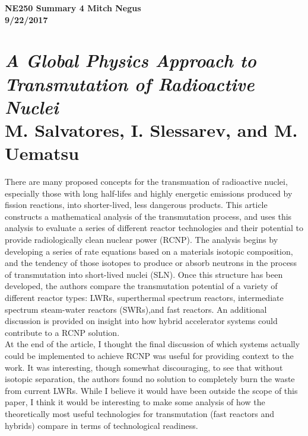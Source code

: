 \documentclass{report}
\newcommand{\tab}{\-\hspace{1cm}}
\begin{document}
\thispagestyle{empty}

{\bf {\large {NE250 Summary {4} \hfill Mitch Negus\\
		\hspace*{\fill} 9/22/2017\\ }}}
\section*{\textsl{A Global Physics Approach to Transmutation of Radioactive Nuclei} \\ \normalsize M. Salvatores, I. Slessarev, and M. Uematsu}

\tab There are many proposed concepts for the transmuation of radioactive nuclei, especially those with long half-lifes and highly energetic emissions produced by fission reactions, into shorter-lived, less dangerous products. This article constructs a mathematical analysis of the transmutation process, and uses this analysis to evaluate a series of different reactor technologies and their potential to provide radiologically clean nuclear power (RCNP). The analysis begins by developing a series of rate equations based on a materials isotopic composition, and the tendency of those isotopes to produce or absorb neutrons in the process of transmutation into short-lived nuclei (SLN). Once this structure has been developed, the authors compare the transmutation potential of a variety of different reactor types: LWRs, superthermal spectrum reactors, intermediate spectrum steam-water reactors (SWRs),and fast reactors. An additional discussion is provided on insight into how hybrid accelerator systems could contribute to a RCNP solution.\\
\tab At the end of the article, I thought the final discussion of which systems actually could be implemented to achieve RCNP was useful for providing context to the work. It was interesting, though somewhat discouraging, to see that without isotopic separation, the authors found no solution to completely burn the waste from current LWRs. While I believe it would have been outside the scope of this paper, I think it would be interesting to make some analysis of how the theoretically most useful technologies for transmutation (fast reactors and hybrids) compare in terms of technological readiness.
\end{document}
